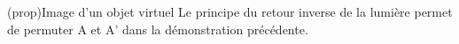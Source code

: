 \documentclass[../../main/main.tex]{subfiles}
\begin{document}
\begin{tcb}[label=prop, sidebyside, righthand ratio=.4](prop){Image d'un objet
			virtuel}
	Le principe du retour inverse de la lumière permet de permuter A et A'
	dans la démonstration précédente.
	\tcblower
	\begin{center}
		\label{fig:mir_plan-obj_v}
	\end{center}
\end{tcb}
\end{document}

